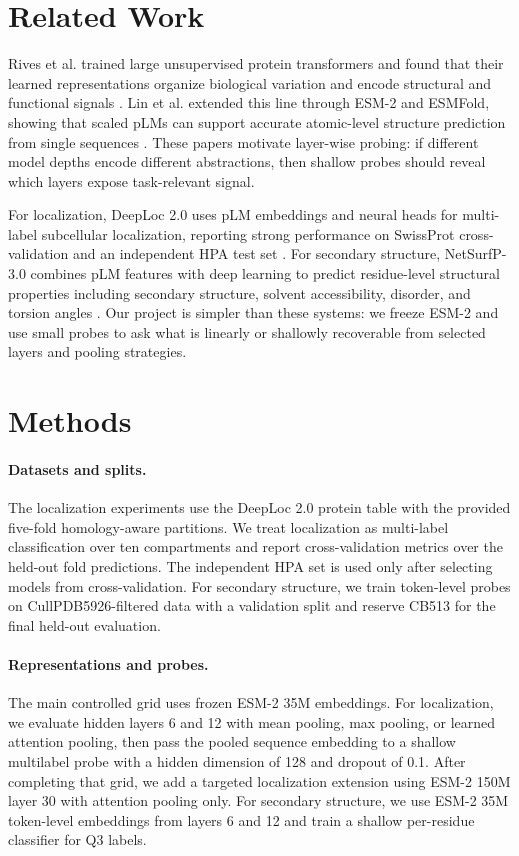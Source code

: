\documentclass{article}
\begin{document}
\section{Related Work}

Rives et al. trained large unsupervised protein transformers and found that their learned representations organize biological variation and encode structural and functional signals \citep{rives2021biological}. Lin et al. extended this line through ESM-2 and ESMFold, showing that scaled pLMs can support accurate atomic-level structure prediction from single sequences \citep{lin2023evolutionary}. These papers motivate layer-wise probing: if different model depths encode different abstractions, then shallow probes should reveal which layers expose task-relevant signal.

For localization, DeepLoc 2.0 uses pLM embeddings and neural heads for multi-label subcellular localization, reporting strong performance on SwissProt cross-validation and an independent HPA test set \citep{thumuluri2022deeploc}. For secondary structure, NetSurfP-3.0 combines pLM features with deep learning to predict residue-level structural properties including secondary structure, solvent accessibility, disorder, and torsion angles \citep{hoie2022netsurfp}. Our project is simpler than these systems: we freeze ESM-2 and use small probes to ask what is linearly or shallowly recoverable from selected layers and pooling strategies.

\section{Methods}

\paragraph{Datasets and splits.}
The localization experiments use the DeepLoc 2.0 protein table with the provided five-fold homology-aware partitions. We treat localization as multi-label classification over ten compartments and report cross-validation metrics over the held-out fold predictions. The independent HPA set is used only after selecting models from cross-validation. For secondary structure, we train token-level probes on CullPDB5926-filtered data with a validation split and reserve CB513 for the final held-out evaluation.

\paragraph{Representations and probes.}
The main controlled grid uses frozen ESM-2 35M embeddings. For localization, we evaluate hidden layers 6 and 12 with mean pooling, max pooling, or learned attention pooling, then pass the pooled sequence embedding to a shallow multilabel probe with a hidden dimension of 128 and dropout of 0.1. After completing that grid, we add a targeted localization extension using ESM-2 150M layer 30 with attention pooling only. For secondary structure, we use ESM-2 35M token-level embeddings from layers 6 and 12 and train a shallow per-residue classifier for Q3 labels.
\end{document}
